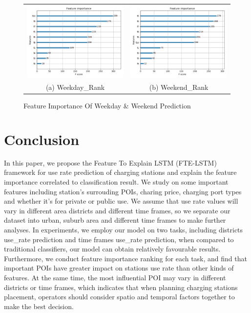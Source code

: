 \documentclass[runningheads]{llncs}
\begin{document}
\begin{figure}[!htbp]
	\begin{tabular}{cc}
		\includegraphics[width=0.5\columnwidth]{./figures/weekday_rank.pdf} &  \includegraphics[width=0.5\columnwidth]{./figures/weekend_rank.pdf} \\
		(a) Weekday\_Rank & (b) Weekend\_Rank \\
	\end{tabular}
	\centering
	\caption{Feature Importance Of Weekday \& Weekend Prediction}
	\label{fig12}
\end{figure}

\section{Conclusion}
In this paper, we propose the Feature To Explain LSTM (FTE-LSTM) framework for use rate prediction of charging stations and explain the feature importance correlated to classification result. We study on some important features including station's surrouding POIs, charing price, charging port types and whether it's for private or public use. We assume that use rate values will vary in different area districts and different time frames, so we separate our dataset into urban, suburb area and different time frames to make further analyses. In experiments, we employ our model on two tasks, including districts use\_rate prediction and time frames use\_rate prediction, when compared to traditional classifiers, our model can obtain relatively favourable results. Furthermore, we conduct feature importance ranking for each task, and find that important POIs have greater impact on stations use rate than other kinds of features. At the same time, the most influential POI may vary in different districts or time frames, which indicates that when planning charging stations placement, operators should consider spatio and temporal factors together to make the best decision.
\end{document}

